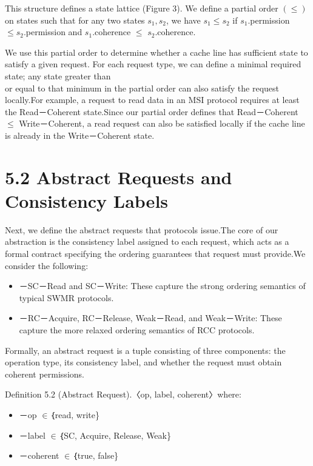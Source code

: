 \documentclass[10pt]{article}
\begin{document}
This structure defines a state lattice (Figure 3). We define a partial order $(\leq)$ on states such that for any two states $s_{1}, s_{2}$, we have $s_{1} \leq s_{2}$ if $s_{1}$.permission $\leq s_{2}$.permission and $s_{1}$.coherence $\leq$ $s_{2}$.coherence.

We use this partial order to determine whether a cache line has sufficient state to satisfy a given request. For each request type, we can define a minimal required state; any state greater than\\
or equal to that minimum in the partial order can also satisfy the request locally.For example, a request to read data in an MSI protocol requires at least the Read－Coherent state.Since our partial order defines that Read－Coherent $\leq$ Write－Coherent, a read request can also be satisfied locally if the cache line is already in the Write－Coherent state.

\section*{5.2 Abstract Requests and Consistency Labels}
Next, we define the abstract requests that protocols issue.The core of our abstraction is the consistency label assigned to each request, which acts as a formal contract specifying the ordering guarantees that request must provide.We consider the following: 

\begin{itemize}
  \item[] －SC－Read and SC－Write: These capture the strong ordering semantics of typical SWMR protocols.
  \item[] －RC－Acquire, RC－Release, Weak－Read, and Weak－Write: These capture the more relaxed ordering semantics of RCC protocols.
\end{itemize}

Formally, an abstract request is a tuple consisting of three components: the operation type, its consistency label, and whether the request must obtain coherent permissions.

Definition 5.2 (Abstract Request).〈op, label, coherent〉where: 

\begin{itemize}
  \item[] －op $\in$｛read, write\}
  \item[] －label $\in$｛SC, Acquire, Release, Weak\}
  \item[] －coherent $\in$｛true, false\}
\end{itemize}
\end{document}
